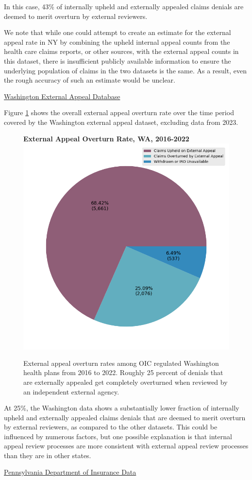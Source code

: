 \documentclass[12pt, a4paper,twoside]{report}
\theoremstyle{plain} %
\theoremstyle{definition} %
\theoremstyle{remark} %
\numberwithin{equation}{chapter}
\begin{document}
		In this case, 43\% of internally upheld and externally appealed claims denials are deemed to merit overturn by external reviewers.
		
		We note that while one could attempt to create an estimate for the external appeal rate in NY by combining the upheld internal appeal counts from the health care claims reports, or other sources, with the external appeal counts in this dataset, there is insufficient publicly available information to ensure the underlying population of claims in the two datasets is the same. As a result, even the rough accuracy of such an estimate would be unclear.
		
		\underline{Washington External Appeal Database}
		
		Figure \ref{waexternalappealpie} shows the overall external appeal overturn rate over the time period covered by the Washington external appeal dataset, excluding data from 2023.
		
		
		\begin{figure}[h!]
			\centering
			\textbf{External Appeal Overturn Rate, WA, 2016-2022}
			\includegraphics[width=.4\textwidth]{images/wa_external_appeals/external_appeal_success_rates.png}
			\caption{External appeal overturn rates among OIC regulated Washington health plans from 2016 to 2022. Roughly 25 percent of denials that are externally appealed get completely overturned when reviewed by an independent external agency.}
			\label{waexternalappealpie}
		\end{figure}
	
		At 25\%, the Washington data shows a substantially lower fraction of internally upheld and externally appealed claims denials that are deemed to merit overturn by external reviewers, as compared to the other datasets. This could be influenced by numerous factors, but one possible explanation is that internal appeal review processes are more consistent with external appeal review processes than they are in other states.
		
		\underline{Pennsylvania Department of Insurance Data}
		
\end{document}
